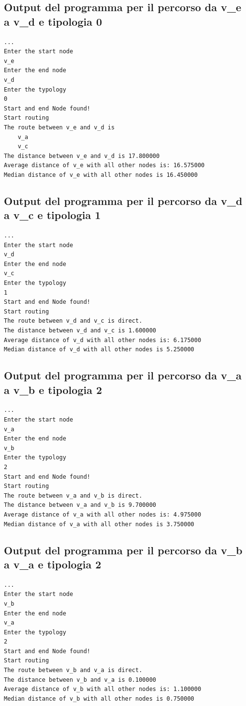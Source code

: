 \documentclass[11pt, a4paper, titlepage, block]{article}
\begin{document}
	\subsection{Output del programma per il percorso da v\_e a v\_d e tipologia 0}
	\begin{lstlisting}
...
Enter the start node
v_e
Enter the end node
v_d
Enter the typology
0
Start and end Node found!
Start routing
The route between v_e and v_d is
	v_a
	v_c
The distance between v_e and v_d is 17.800000
Average distance of v_e with all other nodes is: 16.575000
Median distance of v_e with all other nodes is 16.450000
	\end{lstlisting}
	
		\subsection{Output del programma per il percorso da v\_d a v\_c e tipologia 1}
	\begin{lstlisting}
...
Enter the start node
v_d
Enter the end node
v_c
Enter the typology
1
Start and end Node found!
Start routing
The route between v_d and v_c is direct.
The distance between v_d and v_c is 1.600000
Average distance of v_d with all other nodes is: 6.175000
Median distance of v_d with all other nodes is 5.250000
	\end{lstlisting}
	\newpage
	\subsection{Output del programma per il percorso da v\_a a v\_b e tipologia 2}
	\begin{lstlisting}
...
Enter the start node
v_a
Enter the end node
v_b
Enter the typology
2
Start and end Node found!
Start routing
The route between v_a and v_b is direct.
The distance between v_a and v_b is 9.700000
Average distance of v_a with all other nodes is: 4.975000
Median distance of v_a with all other nodes is 3.750000
	\end{lstlisting}
	\subsection{Output del programma per il percorso da v\_b a v\_a e tipologia 2}
	\begin{lstlisting}
...
Enter the start node
v_b
Enter the end node
v_a
Enter the typology
2
Start and end Node found!
Start routing
The route between v_b and v_a is direct.
The distance between v_b and v_a is 0.100000
Average distance of v_b with all other nodes is: 1.100000
Median distance of v_b with all other nodes is 0.750000
\end{lstlisting}
	
\end{document}
